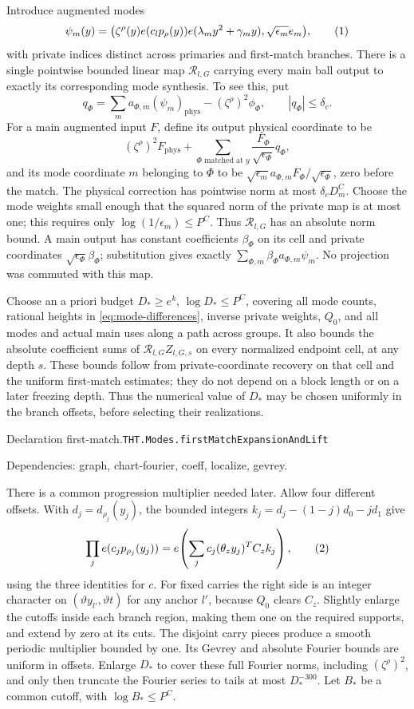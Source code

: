 \documentclass[11pt]{article}
\theoremstyle{definition}
\newcommand{\phys}{\mathrm{phys}}
\newcommand{\eqtag}[1]{\refstepcounter{equation}\tag{\theequation}\label{#1}}
\numberwithin{equation}{section}
\newcommand{\bp}[3]{\par\smallskip\begingroup\footnotesize
\noindent\hypertarget{bp:#1}{\textsf{Declaration #1.}}\quad\nolinkurl{#2}\par
\noindent\textsf{Dependencies:} #3.\par\endgroup\smallskip}
\begin{document}
Introduce augmented modes
\[
 \psi_m(y)=\bigl(\zeta^\rho(y)e(c_lp_\rho(y))e(\lambda_my^2+\gamma_my),\sqrt{\epsilon_m}e_m\bigr),
 \eqtag{eq:modes}
\]
with private indices distinct across primaries and first-match branches. There is a single pointwise bounded linear map $\mathcal R_{l,G}$ carrying every main ball output to exactly its corresponding mode synthesis. To see this, put
\[
 q_\Phi=\sum_ma_{\Phi,m}(\psi_m)_{\phys}-(\zeta^\rho)^2\phi_\Phi,
 \qquad |q_\Phi|\le\delta_c.
\]
For a main augmented input $F$, define its output physical coordinate to be
\[
 (\zeta^\rho)^2F_{\phys}+\sum_{\Phi\text{ matched at }y}\frac{F_\Phi}{\sqrt{\epsilon_\Phi}}q_\Phi,
\]
and its mode coordinate $m$ belonging to $\Phi$ to be $\sqrt{\epsilon_m}a_{\Phi,m}F_\Phi/\sqrt{\epsilon_\Phi}$, zero before the match. The physical correction has pointwise norm at most $\delta_cD_m^C$. Choose the mode weights small enough that the squared norm of the private map is at most one; this requires only $\log(1/\epsilon_m)\le P^C$. Thus $\mathcal R_{l,G}$ has an absolute norm bound. A main output has constant coefficients $\beta_\Phi$ on its cell and private coordinates $\sqrt{\epsilon_\Phi}\beta_\Phi$; substitution gives exactly $\sum_{\Phi,m}\beta_\Phi a_{\Phi,m}\psi_m$. No projection was commuted with this map.

Choose an a priori budget $D_*\ge e^k$, $\log D_*\le P^C$, covering all mode counts, rational heights in \eqref{eq:mode-differences}, inverse private weights, $Q_0$, and all modes and actual main uses along a path across groups. It also bounds the absolute coefficient sums of $\mathcal R_{l,G}Z_{l,G,s}$ on every normalized endpoint cell, at any depth $s$. These bounds follow from private-coordinate recovery on that cell and the uniform first-match estimates; they do not depend on a block length or on a later freezing depth. Thus the numerical value of $D_*$ may be chosen uniformly in the branch offsets, before selecting their realizations.

\bp{first-match}{THT.Modes.firstMatchExpansionAndLift}{graph, chart-fourier, coeff, localize, gevrey}

There is a common progression multiplier needed later. Allow four different offsets. With $d_j=d_{\rho_j}(y_j)$, the bounded integers $k_j=d_j-(1-j)d_0-jd_1$ give
\[
 \prod_je(c_jp_{\rho_j}(y_j))
 =e\!\left(\sum_jc_j(\theta_zy_j)^TC_zk_j\right),
 \eqtag{eq:gauge-cancel}
\]
using the three identities for $c$. For fixed carries the right side is an integer character on $(\vartheta y_{l'},\vartheta t)$ for any anchor $l'$, because $Q_0$ clears $C_z$. Slightly enlarge the cutoffs inside each branch region, making them one on the required supports, and extend by zero at its cuts. The disjoint carry pieces produce a smooth periodic multiplier bounded by one. Its Gevrey and absolute Fourier bounds are uniform in offsets. Enlarge $D_*$ to cover these full Fourier norms, including $(\zeta^\rho)^2$, and only then truncate the Fourier series to tails at most $D_*^{-300}$. Let $B_*$ be a common cutoff, with $\log B_*\le P^C$.
\end{document}
